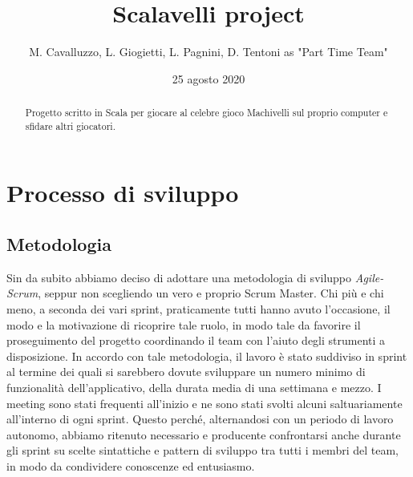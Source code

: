 \documentclass[a4paper,10pt]{report}
\title{Scalavelli project}
\date{25 agosto 2020}
\author{M. Cavalluzzo, L. Giogietti, L. Pagnini, D. Tentoni as "Part Time Team"}
\begin{document}
    \maketitle
    \newpage

    \begin{abstract}
        Progetto scritto in Scala per giocare al celebre gioco Machivelli sul proprio computer e sfidare altri giocatori.
    \end{abstract}

    \tableofcontents

    \newpage


    \section{Processo di sviluppo}

    \subsection{Metodologia}

    Sin da subito abbiamo deciso di adottare una metodologia di sviluppo \textit{Agile-Scrum}, seppur non scegliendo un
    vero e proprio Scrum Master. Chi più e chi meno, a seconda dei vari sprint, praticamente tutti hanno avuto
    l'occasione, il modo e la motivazione di ricoprire tale ruolo, in modo tale da favorire il proseguimento del
    progetto coordinando il team con l'aiuto degli strumenti a disposizione. %
    In accordo con tale metodologia, il lavoro è stato suddiviso in sprint al termine dei quali si sarebbero dovute
    sviluppare un numero minimo di funzionalità dell'applicativo, della durata media di una settimana e mezzo. I meeting
    sono stati frequenti all'inizio e ne sono stati svolti alcuni saltuariamente all'interno di ogni sprint. Questo
    perché, alternandosi con un periodo di lavoro autonomo, abbiamo ritenuto necessario e producente confrontarsi anche
    durante gli sprint su scelte sintattiche e pattern di sviluppo tra tutti i membri del team, in modo da condividere
    conoscenze ed entusiasmo.
\end{document}
